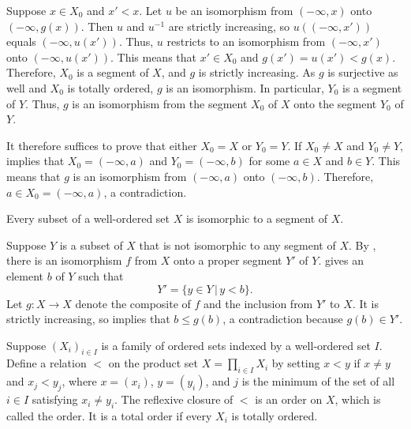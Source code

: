 \documentclass{article}
\begin{document}
Suppose \(x \in X_0\) and \(x' < x\).  Let \(u\) be an isomorphism
from \((-\infty, x)\) onto \((-\infty, g(x))\).  Then \(u\) and
\(u^{-1}\) are strictly increasing, so \(u((-\infty, x'))\) equals
\((-\infty, u(x'))\).  Thus, \(u\) restricts to an isomorphism from
\((-\infty, x')\) onto \((-\infty, u(x'))\).  This means that
\(x' \in X_0\) and \(g(x') = u(x') < g(x)\).  Therefore, \(X_0\) is a
segment of \(X\), and \(g\) is strictly increasing.  As \(g\) is
surjective as well and \(X_0\) is totally ordered, \(g\) is an
isomorphism.  In particular, \(Y_0\) is a segment of \(Y\).  Thus,
\(g\) is an isomorphism from the segment \(X_0\) of \(X\) onto the
segment \(Y_0\) of \(Y\).

It therefore suffices to prove that either \(X_0 = X\) or \(Y_0 = Y\).
If \(X_0 \neq X\) and \(Y_0 \neq Y\),  implies that
\(X_0 = (-\infty, a)\) and \(Y_0 = (-\infty, b)\) for some \(a \in X\)
and \(b \in Y\).  This means that \(g\) is an isomorphism from
\((-\infty, a)\) onto \((-\infty, b)\).  Therefore,
\(a \in X_0 = (-\infty, a)\), a contradiction.

\begin{theorem}
  \label{thm:xhbclgwz}
  Every subset of a well-ordered set \(X\) is isomorphic to a segment
  of \(X\).
\end{theorem}

Suppose \(Y\) is a subset of \(X\) that is not isomorphic to any
segment of \(X\).  By , there is an isomorphism
\(f\) from \(X\) onto a proper segment \(Y'\) of \(Y\).
 gives an element \(b\) of \(Y\) such that
\begin{displaymath}
  Y' = \{ y \in Y \,\vert\, y < b \}.
\end{displaymath}
Let \(g : X \to X\) denote the composite of \(f\) and the inclusion
from \(Y'\) to \(X\).  It is strictly increasing, so
 implies that \(b \leq g(b)\), a contradiction
because \(g(b) \in Y'\).

Suppose \((X_i)_{i \in I}\) is a family of ordered sets indexed by a
well-ordered set \(I\).  Define a relation \(<\) on the product set
\(X = \prod_{i \in I} X_i\) by setting \(x < y\) if \(x \neq y\) and
\(x_j < y_j\), where \(x = (x_i)\), \(y = (y_i)\), and \(j\) is the
minimum of the set of all \(i \in I\) satisfying \(x_i \neq y_i\).
The reflexive closure of \(<\) is an order on \(X\), which is called
the  order.  It is a total order if every
\(X_i\) is totally ordered.
\end{document}
